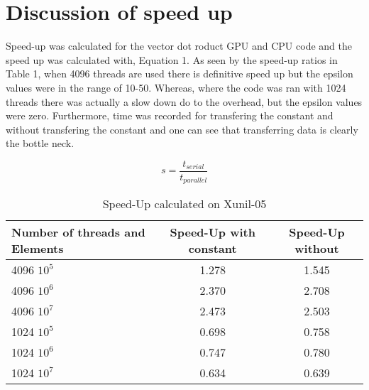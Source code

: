 \documentclass[12pt]{article}
\begin{document}
\pagebreak
\vspace{-0.6cm}
\section{Discussion of speed up}
\vspace{-0.4cm}

\qquad Speed-up was calculated for the vector dot roduct GPU and CPU code
and the speed up was calculated with, Equation 1. 
As seen by the speed-up ratios in Table 1, when 4096 threads are used there
is definitive speed up but the epsilon values were in the range of 10-50.
Whereas, where the code was ran with 1024 threads there was actually a slow
down do to the overhead, but the epsilon values were zero. Furthermore, time
was recorded for transfering the constant and without transfering the
constant and one can see that transferring data is clearly the bottle neck. 
 
\begin{equation}
    s = \frac{t_{serial}}{t_{parallel}}\label{eq1}
\end{equation}

\begin{table}[H]
\centering
\begin{tabular}{@{}|l|c|c|}
\hline
Number of threads and Elements& Speed-Up with constant & Speed-Up without \\ \hline
4096 $10^5$  & 1.278  & 1.545 \\ \hline 
4096 $10^6$  & 2.370  & 2.708 \\ \hline 
4096 $10^7$  & 2.473  & 2.503 \\ \hline 
1024 $10^5$  & 0.698  & 0.758 \\ \hline
1024 $10^6$  & 0.747  & 0.780 \\ \hline
1024 $10^7$  & 0.634  & 0.639 \\ \hline
\end{tabular}
\caption{Speed-Up calculated on Xunil-05}
\end{table}
\end{document}
